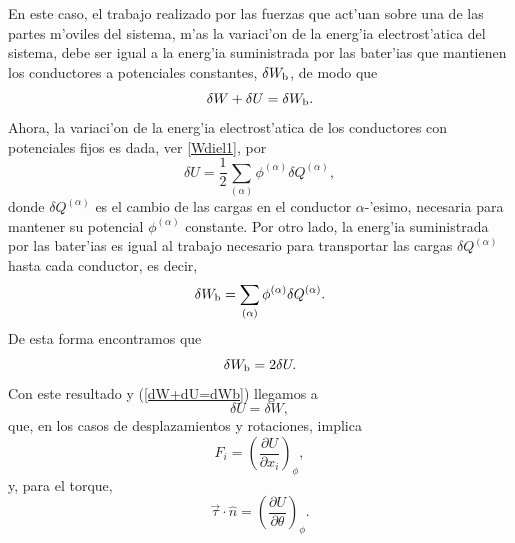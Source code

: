 En este caso, el trabajo realizado por las fuerzas que act'uan sobre una de
las partes m'oviles del sistema, m'as la variaci'on de la energ'ia
electrost'atica del sistema, debe ser igual a la energ'ia suministrada por las
bater'ias que mantienen los conductores a potenciales constantes, $\delta
W_{\rm b}$, de modo que
\begin{equation}
 \delta W + \delta U=\delta W_{\rm b}. \label{dW+dU=dWb}
\end{equation}
Ahora, la variaci'on de la energ'ia electrost'atica de los conductores con
potenciales fijos es dada, ver \eqref{Wdiel1}, por
\begin{equation}
 \delta U=\frac{1}{2}\sum_{(\alpha)}\phi^{(\alpha)}\delta Q^{(\alpha)},
\end{equation}
donde $\delta Q^{(\alpha)}$ es el cambio de las cargas en el conductor $\alpha$-'esimo,
necesaria para mantener su potencial $\phi^{(\alpha)}$ constante. Por otro lado, 
la energ'ia suministrada por las bater'ias es igual al trabajo necesario para
transportar las cargas $\delta Q^{(\alpha)}$ hasta cada conductor, es decir,
\begin{equation}
 \delta W_{\rm b}=\sum_{(\alpha)}\phi^{(\alpha)}\delta Q^{(\alpha)}.
\end{equation}
De esta forma encontramos que
\begin{equation}
 \delta W_{\rm b}=2\delta U.
\end{equation}
Con este resultado y (\ref{dW+dU=dWb}) llegamos a
\begin{equation}
 \delta U=\delta W,
\end{equation}
que, en los casos de desplazamientos y rotaciones, implica
\begin{equation}
\boxed{F_i=\left(\frac{\partial U}{\partial x_i}\right)_\phi ,}
\end{equation}
y, para el torque,
\begin{equation}
 \boxed{\vec{\tau}\cdot\hat{n}=\left(\frac{\partial
U}{\partial\theta}\right)_\phi
.}
\end{equation}


